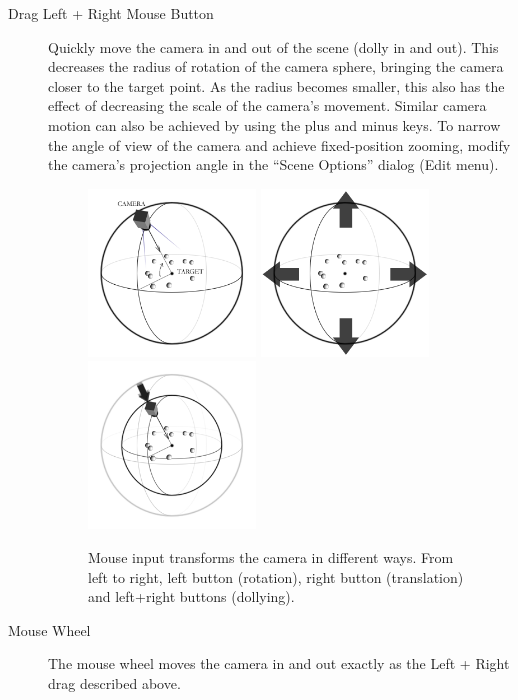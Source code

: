 \begin{description}
\item[Drag Left + Right Mouse Button]
	Quickly move the camera in and out of the scene (dolly in and out).  This decreases the radius of rotation of the camera sphere, bringing the camera closer to the target point.  As the radius becomes smaller, this also has the effect of decreasing the scale of the camera's movement.  Similar camera motion can also be achieved by using the plus and minus keys.  To narrow the angle of view of the camera and achieve fixed-position zooming, modify the camera's projection angle in the ``Scene Options'' dialog (Edit menu). 
\begin{figure}
	\centering
	\includegraphics[width=1.75in]{figures/SphereA.png}
	\includegraphics[width=1.75in]{figures/SphereB.png}
	\includegraphics[width=1.75in]{figures/SphereC.png}
	\caption[Mouse input transforms the camera]{Mouse input transforms the camera in different ways.  From left to right, left button (rotation), right button (translation) and left+right buttons (dollying).}
	\label{mouse-input}
\end{figure}
	
\item[Mouse Wheel]
	The mouse wheel moves the camera in and out exactly as the Left + Right drag described above.
	

\end{description}
